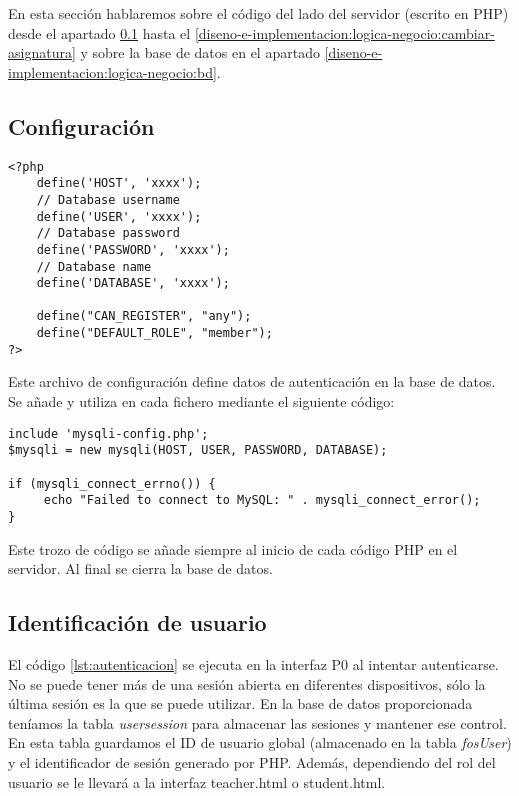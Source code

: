 En esta sección hablaremos sobre el código del lado del servidor (escrito en PHP) desde el apartado \ref{diseno-e-implementacion:configuracion} hasta el \ref{diseno-e-implementacion:logica-negocio:cambiar-asignatura} y sobre la base de datos en el apartado \ref{diseno-e-implementacion:logica-negocio:bd}.\\

\subsection{Configuración}
\label{diseno-e-implementacion:configuracion}

\noindent
\begin{lstlisting}[caption=Autenticación del usuario.,label={lst:autenticacion}]
<?php
	define('HOST', 'xxxx');
	// Database username
	define('USER', 'xxxx');
	// Database password
	define('PASSWORD', 'xxxx');
	// Database name
	define('DATABASE', 'xxxx'); 
	 
	define("CAN_REGISTER", "any");
	define("DEFAULT_ROLE", "member");
?>
\end{lstlisting}

Este archivo de configuración define datos de autenticación en la base de datos. Se añade y utiliza en cada fichero mediante el siguiente código:

\noindent
\begin{lstlisting}[caption=Autenticación del usuario.,label={lst:autenticacion}]
include 'mysqli-config.php';
$mysqli = new mysqli(HOST, USER, PASSWORD, DATABASE);

if (mysqli_connect_errno()) {
     echo "Failed to connect to MySQL: " . mysqli_connect_error();
}
\end{lstlisting}

Este trozo de código se añade siempre al inicio de cada código PHP en el servidor. Al final se cierra la base de datos.\\

\subsection{Identificación de usuario}
\label{diseno-e-implementacion:logica-negocio:identificacion}

El código \ref{lst:autenticacion} se ejecuta en la interfaz P0 al intentar autenticarse. No se puede tener más de una sesión abierta en diferentes dispositivos, sólo la última sesión es la que se puede utilizar. En la base de datos proporcionada teníamos la tabla \textit{usersession} para almacenar las sesiones y mantener ese control. En esta tabla guardamos el ID de usuario global (almacenado en la tabla \textit{fosUser}) y el identificador de sesión generado por PHP. Además, dependiendo del rol del usuario se le llevará a la interfaz teacher.html o student.html.\\

